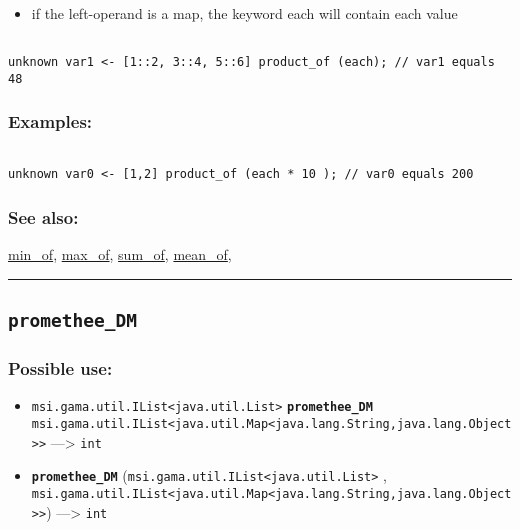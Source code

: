 \documentclass[]{book}
\providecommand{\tightlist}{%
  \setlength{\itemsep}{0pt}\setlength{\parskip}{0pt}}
\theoremstyle{definition}
\theoremstyle{definition}
\theoremstyle{definition}
\theoremstyle{remark}
\begin{document}
\begin{itemize}
\tightlist
\item
  if the left-operand is a map, the keyword each will contain each value
\end{itemize}

\begin{verbatim}
 
unknown var1 <- [1::2, 3::4, 5::6] product_of (each); // var1 equals 48
\end{verbatim}

\subsubsection{Examples:}\label{examples-291}

\begin{verbatim}
 
unknown var0 <- [1,2] product_of (each * 10 ); // var0 equals 200
\end{verbatim}

\subsubsection{See also:}\label{see-also-169}

\href{OperatorsIM\#min_of}{min\_of},
\href{OperatorsIM\#max_of}{max\_of},
\href{OperatorsSZ\#sum_of}{sum\_of},
\href{OperatorsIM\#mean_of}{mean\_of},

\begin{center}\rule{0.5\linewidth}{\linethickness}\end{center}

\subsection{\texorpdfstring{\texttt{promethee\_DM}}{promethee\_DM}}\label{promethee_dm}

\subsubsection{Possible use:}\label{possible-use-419}

\begin{itemize}
\tightlist
\item
  \texttt{msi.gama.util.IList\textless{}java.util.List\textgreater{}}
  \textbf{\texttt{promethee\_DM}}
  \texttt{msi.gama.util.IList\textless{}java.util.Map\textless{}java.lang.String,java.lang.Object\textgreater{}\textgreater{}}
  ---\textgreater{} \texttt{int}
\item
  \textbf{\texttt{promethee\_DM}}
  (\texttt{msi.gama.util.IList\textless{}java.util.List\textgreater{}} ,
  \texttt{msi.gama.util.IList\textless{}java.util.Map\textless{}java.lang.String,java.lang.Object\textgreater{}\textgreater{}})
  ---\textgreater{} \texttt{int}
\end{itemize}
\end{document}
